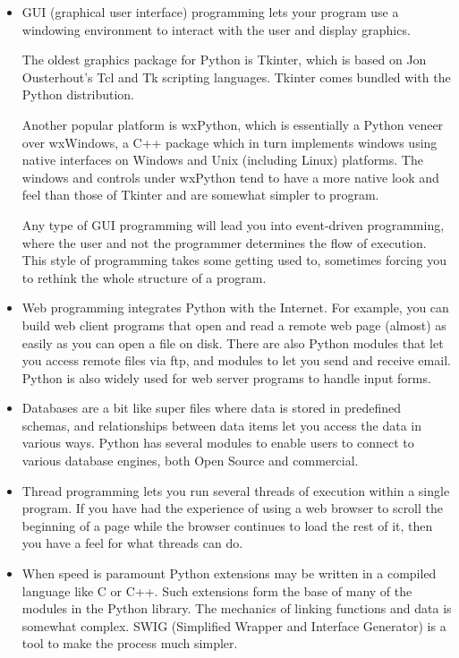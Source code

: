 \begin{itemize}

\item GUI (graphical user interface) programming lets your
program use a windowing environment to interact with the user and
display graphics.

The oldest graphics package for Python
is Tkinter, which is based on Jon Ousterhout's Tcl and Tk scripting
languages.  Tkinter comes bundled with the Python distribution.

Another
popular platform is wxPython, which is essentially a Python veneer over
wxWindows, a C++ package which in turn implements windows using native
interfaces on Windows and Unix (including Linux) platforms.  The
windows and controls under wxPython tend to have a more native look
and feel than those of Tkinter and are somewhat simpler to
program.

Any type of GUI programming will lead you into event-driven
programming, where the user and not the programmer determines the flow of
execution.  This style of programming takes some getting used to,
sometimes forcing you to rethink the whole structure of a program.

\item Web programming integrates Python with the Internet.
For example, you can build web client programs that open and read
a remote web page (almost) as easily as you can open a file on
disk.  There are also Python modules that let you access remote files
via ftp, and modules to let you send and receive email.  Python is also
widely used for web server programs to handle input forms.

\item Databases are a bit like super files where data is stored in
predefined schemas, and relationships between data items let you access
the data in various ways.  Python has several modules to enable
users to connect to various database engines, both Open Source and
commercial.

\item Thread programming lets you run several threads of execution 
within a single program.  If you have had the experience of using a
web browser to scroll the beginning of a page while the browser
continues to load the rest of it, then you have a feel for what
threads can do.

\item When speed is paramount Python extensions may be written in a
compiled language like C or C++.  Such extensions
form the base of many of the modules in the Python
library. The mechanics of linking functions and data is somewhat
complex.  SWIG (Simplified Wrapper and Interface Generator) is a tool to
make the process much simpler.

\end{itemize}


